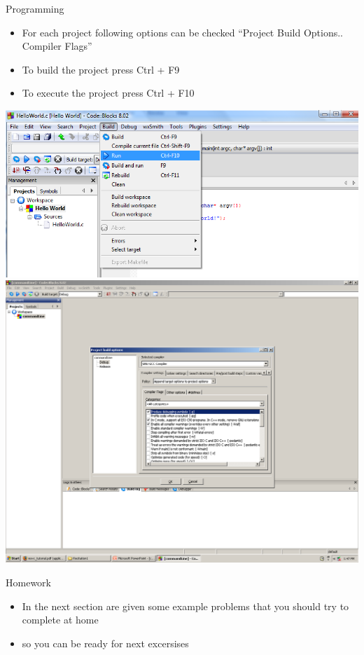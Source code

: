 \begin{frame}{Programming}
\begin{itemize}
  \item For each project following options can be checked ``Project Build
  Options.. Compiler Flags''
  \item To build the project press Ctrl + F9
  \item To execute the project press Ctrl + F10
\end{itemize}
\begin{center}
\includegraphics[scale=0.25]{images/cb_run}
\includegraphics[scale=0.1]{images/cb_flags}
\end{center}
\end{frame}

\begin{frame}{Homework}
\begin{itemize}
  \item In the next section are given some example problems that you should
  try to complete at home
  \item so you can be ready for next excersises
\end{itemize}
\end{frame}


